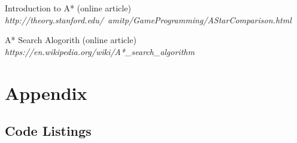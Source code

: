 \documentclass[11pt, a4paper]{article}
\begin{document}
\begin{thebibliography}{}
\par{Introduction to A* (online article)}
\\
\textit{http://theory.stanford.edu/~amitp/GameProgramming/AStarComparison.html}



\par{A* Search Alogorith (online article)}
\\
\textit{https://en.wikipedia.org/wiki/A*\_search\_algorithm}




\end{thebibliography}

\newpage
\section*{Appendix}
\subsection{Code Listings}
\label{Code}
















\end{document}
